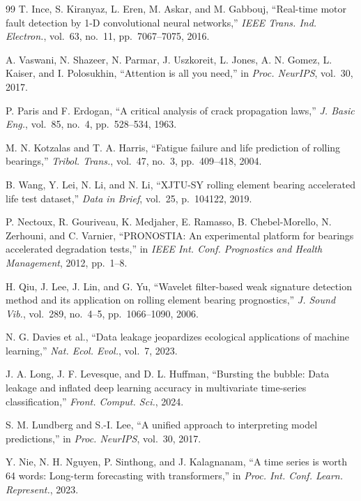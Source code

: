 \documentclass[pdflatex,sn-mathphys-num]{sn-jnl}
\begin{document}
\begin{thebibliography}{99}
T. Ince, S. Kiranyaz, L. Eren, M. Askar, and M. Gabbouj,
``Real-time motor fault detection by 1-D convolutional neural networks,''
\textit{IEEE Trans. Ind. Electron.}, vol.~63, no.~11, pp.~7067--7075, 2016.

A. Vaswani, N. Shazeer, N. Parmar, J. Uszkoreit, L. Jones, A. N. Gomez, L. Kaiser, and I. Polosukhin,
``Attention is all you need,''
in \textit{Proc. NeurIPS}, vol.~30, 2017.

P. Paris and F. Erdogan,
``A critical analysis of crack propagation laws,''
\textit{J. Basic Eng.}, vol.~85, no.~4, pp.~528--534, 1963.

M. N. Kotzalas and T. A. Harris,
``Fatigue failure and life prediction of rolling bearings,''
\textit{Tribol. Trans.}, vol.~47, no.~3, pp.~409--418, 2004.

B. Wang, Y. Lei, N. Li, and N. Li,
``XJTU-SY rolling element bearing accelerated life test dataset,''
\textit{Data in Brief}, vol.~25, p.~104122, 2019.

P. Nectoux, R. Gouriveau, K. Medjaher, E. Ramasso, B. Chebel-Morello, N. Zerhouni, and C. Varnier,
``PRONOSTIA: An experimental platform for bearings accelerated degradation tests,''
in \textit{IEEE Int. Conf. Prognostics and Health Management}, 2012, pp.~1--8.

H. Qiu, J. Lee, J. Lin, and G. Yu,
``Wavelet filter-based weak signature detection method and its application on rolling element bearing prognostics,''
\textit{J. Sound Vib.}, vol.~289, no.~4--5, pp.~1066--1090, 2006.

N. G. Davies et al.,
``Data leakage jeopardizes ecological applications of machine learning,''
\textit{Nat. Ecol. Evol.}, vol.~7, 2023.

J. A. Long, J. F. Levesque, and D. L. Huffman,
``Bursting the bubble: Data leakage and inflated deep learning accuracy in multivariate time-series classification,''
\textit{Front. Comput. Sci.}, 2024.

S. M. Lundberg and S.-I. Lee,
``A unified approach to interpreting model predictions,''
in \textit{Proc. NeurIPS}, vol.~30, 2017.

Y. Nie, N. H. Nguyen, P. Sinthong, and J. Kalagnanam,
``A time series is worth 64 words: Long-term forecasting with transformers,''
in \textit{Proc. Int. Conf. Learn. Represent.}, 2023.

\end{thebibliography}
\end{document}
